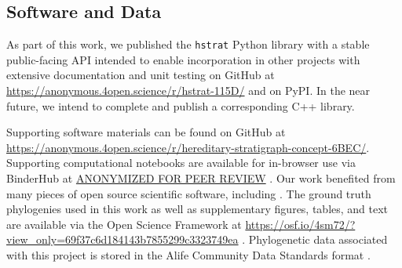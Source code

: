 \subsection{Software and Data}


As part of this work, we published the \texttt{hstrat} Python library with a stable public-facing API intended to enable incorporation in other projects with extensive documentation and unit testing on GitHub at \url{https://anonymous.4open.science/r/hstrat-115D/} and on PyPI.%
In the near future, we intend to complete and publish a corresponding C++ library.

Supporting software materials can be found on GitHub at \url{https://anonymous.4open.science/r/hereditary-stratigraph-concept-6BEC/}.%
Supporting computational notebooks are available for in-browser use via BinderHub at \url{ANONYMIZED FOR PEER REVIEW} \citep{ragan2018binder}. %
Our work benefited from many pieces of open source scientific software, including \citep{sukumaran2010dendropy,virtanen2020scipy,hunter2007matplotlib,virtanen2020scipy,waskom2021seaborn,bostock2011d3,meurer2017sympy,smith2020treedistdata,paradis2004ape,ushey2022reticulate,wickham2022dplyr}.
The ground truth phylogenies used in this work as well as supplementary figures, tables, and text are available via the Open Science Framework at
\url{https://osf.io/4sm72/?view\_only=69f37c6d184143b7855299c3323749ea} \citep{foster2017open,moreno2022hstratconceptsupplement}.
Phylogenetic data associated with this project is stored in the Alife Community Data Standards format \citep{lalejini2019data}.
